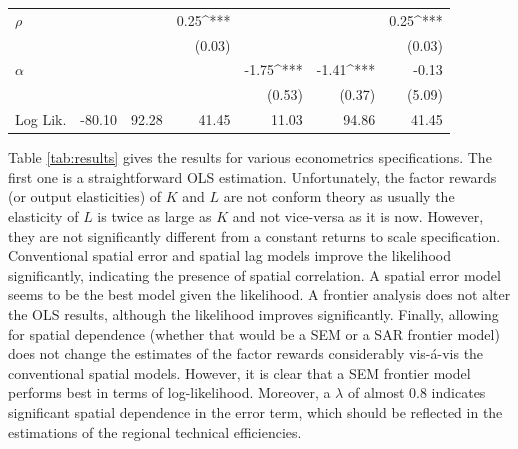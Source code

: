 \documentclass[11pt,parskip,abstracton,notitlepage]{scrartcl}
\begin{document}
\begin{table}[h]
\begin{tabular*}{\columnwidth}{@{\extracolsep{\fill}}l D{.}{.}{3.5}@{} D{.}{.}{2.5}@{} D{.}{.}{2.5}@{} D{.}{.}{2.5}@{} D{.}{.}{2.5}@{} D{.}{.}{2.5}@{} }
	$\rho$            &            &            & 0.25^{***} &             &             & 0.25^{***} \\
	&            &            & (0.03)     &             &             & (0.03)     \\
	$\alpha$          &            &            &            & -1.75^{***} & -1.41^{***} & -0.13      \\
	&            &            &            & (0.53)      & (0.37)      & (5.09)     \\
	\midrule
	Log Lik.          & -80.10     & 92.28      & 41.45      & 11.03       & 94.86       & 41.45      \\
	\bottomrule
\end{tabular*}
\end{table}
%
Table \ref{tab:results} gives the results for various econometrics
specifications. The first one is a straightforward OLS estimation.
Unfortunately, the factor rewards (or output elasticities) of $K$ and $L$ are
not conform theory as usually the elasticity of $L$ is twice as large as $K$ and
not vice-versa as it is now. However, they are not significantly different from
a constant returns to scale specification. Conventional spatial error and
spatial lag models improve the likelihood significantly, indicating the presence
of spatial correlation. A spatial error model seems to be the best model given
the likelihood. A frontier analysis does not alter
the OLS results, although the likelihood improves significantly. Finally,
allowing for spatial dependence (whether that would be a SEM or a SAR frontier
model) does not change the estimates of the factor rewards considerably
vis-\'{a}-vis the conventional spatial models. However, it is clear that a SEM frontier model performs best in terms of log-likelihood. Moreover, a $\lambda$ of almost 0.8 indicates significant spatial dependence in the error term, which should be reflected in the estimations of the regional technical efficiencies.
\end{document}
